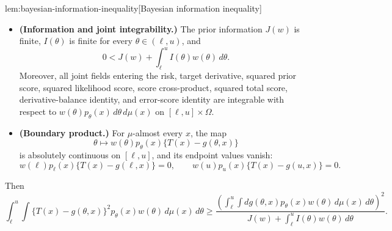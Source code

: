 \documentclass[11pt]{article}
\begin{document}
\begin{lemmav}{lem:bayesian-information-inequality}[Bayesian information inequality]
\begin{itemize}
\item \textbf{(Information and joint integrability.)}  The prior information \(J(w)\) is finite, \(I(\theta)\) is finite for every \(\theta\in(\ell,u)\), and
\[
0<J(w)+\int_\ell^u I(\theta)w(\theta)\,d\theta.
\]
Moreover, all joint fields entering the risk, target derivative, squared prior score, squared likelihood score, score cross-product, squared total score, derivative-balance identity, and error-score identity are integrable with respect to \(w(\theta)p_\theta(x)\,d\theta\,d\mu(x)\) on \([\ell,u]\times\Omega\).
\item \textbf{(Boundary product.)}  For \(\mu\)-almost every \(x\), the map
\[
\theta\mapsto w(\theta)p_\theta(x)\{T(x)-g(\theta,x)\}
\]
is absolutely continuous on \([\ell,u]\), and its endpoint values vanish:
\[
w(\ell)p_\ell(x)\{T(x)-g(\ell,x)\}=0,
\qquad
w(u)p_u(x)\{T(x)-g(u,x)\}=0.
\]
\end{itemize}
Then
\[
\int_\ell^u\int \{T(x)-g(\theta,x)\}^2 p_\theta(x)w(\theta)\,d\mu(x)\,d\theta
\ge
\frac{
\left(\int_\ell^u\int dg(\theta,x)p_\theta(x)w(\theta)\,d\mu(x)\,d\theta\right)^2
}{
J(w)+\int_\ell^u I(\theta)w(\theta)\,d\theta
}.
\]
\end{lemmav}
\end{document}

